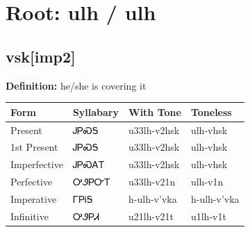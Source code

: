 \documentclass{article}%
\begin{document}
%
\normalsize%
\section*{Root: ulh / ulh}%
\subsection*{vsk[imp2]}%
\textbf{Definition: }%
he/she is covering it%
\\[0.5em]%
\begin{tabular}{|l|l|l|l|}%
\hline%
\textbf{Form}&\textbf{Syllabary}&\textbf{With Tone}&\textbf{Toneless}\\%
\hline%
Present&ᎫᏢᏍᎦ&u33lh{-}v2hsk&ulh{-}vhsk\\%
1st Present&ᎫᏢᏍᎦ&u33lh{-}v2hsk&ulh{-}vhsk\\%
Imperfective&ᎫᏢᏍᎪᎢ&u33lh{-}v2hsk&ulh{-}vhsk\\%
Perfective&ᎤᏭᏢᏅᎢ&u33lh{-}v21n&ulh{-}v1n\\%
Imperative&ᎱᏢᎥᎦ&h{-}ulh{-}v'vka&h{-}ulh{-}v'vka\\%
Infinitive&ᎤᏭᏢᏗ&u21lh{-}v21t&u1lh{-}v1t\\%
\hline%
\end{tabular}%
\\[1em]%
\end{document}
